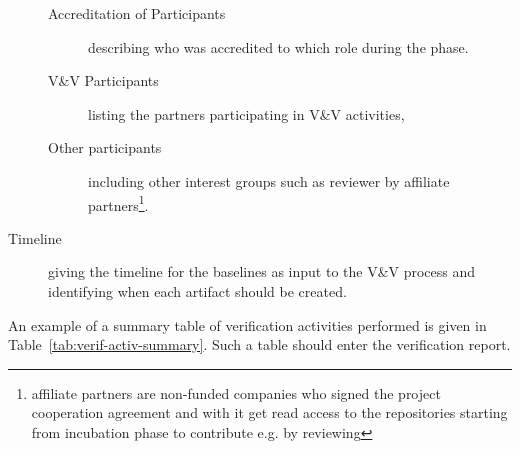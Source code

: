 \documentclass{template/openetcs_report}
\begin{document}
\begin{description}
\begin{description}
\item[Accreditation of Participants] describing who was accredited to
  which role during the \VV phase. 
\item[V\&V Participants] listing the partners participating in V\&V activities,
\item[Other participants] including other interest groups such as
  reviewer by affiliate partners\footnote{affiliate partners are
    non-funded companies who signed the project cooperation agreement
    and with it get read access to the repositories starting from
    incubation phase to contribute e.g. by reviewing}. 
\end{description}

\item[Timeline] giving the timeline for the baselines as input to the
  V\&V process and identifying when each artifact should be created. 
\end{description}



An example of a summary table of verification activities performed is given in Table~\ref{tab:verif-activ-summary}. 
Such a table should enter the verification report. 
\end{document}
